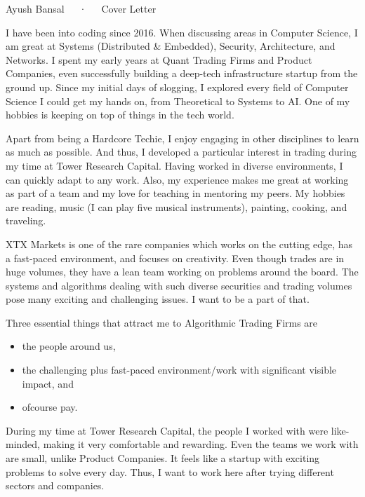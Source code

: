 \documentclass[11pt, a4paper]{awesome-cv}
\begin{document}
\makecvheader

\makecvfooter
  {}
  {Ayush Bansal~~~·~~~Cover Letter}
  {\thepage}

\makelettertitle

\begin{cvletter}

  I have been into coding since 2016. When discussing areas in Computer Science, I am great at Systems (Distributed \& Embedded), Security, Architecture, and Networks. I spent my early years at Quant Trading Firms and Product Companies, even successfully building a deep-tech infrastructure startup from the ground up. Since my initial days of slogging, I explored every field of Computer Science I could get my hands on, from Theoretical to Systems to AI. One of my hobbies is keeping on top of things in the tech world.

  Apart from being a Hardcore Techie, I enjoy engaging in other disciplines to learn as much as possible. And thus, I developed a particular interest in trading during my time at Tower Research Capital. Having worked in diverse environments, I can quickly adapt to any work. Also, my experience makes me great at working as part of a team and my love for teaching in mentoring my peers. My hobbies are reading, music (I can play five musical instruments), painting, cooking, and traveling.

  XTX Markets is one of the rare companies which works on the cutting edge, has a fast-paced environment, and focuses on creativity. Even though trades are in huge volumes, they have a lean team working on problems around the board. The systems and algorithms dealing with such diverse securities and trading volumes pose many exciting and challenging issues. I want to be a part of that.

Three essential things that attract me to Algorithmic Trading Firms are
  \begin{itemize}[noitemsep,topsep=0pt]
    \item the people around us,
    \item the challenging plus fast-paced environment/work with significant visible impact, and
    \item ofcourse pay.
  \end{itemize}
  During my time at Tower Research Capital, the people I worked with were like-minded, making it very comfortable and rewarding. Even the teams we work with are small, unlike Product Companies. It feels like a startup with exciting problems to solve every day. Thus, I want to work here after trying different sectors and companies.


\end{cvletter}
\end{document}
